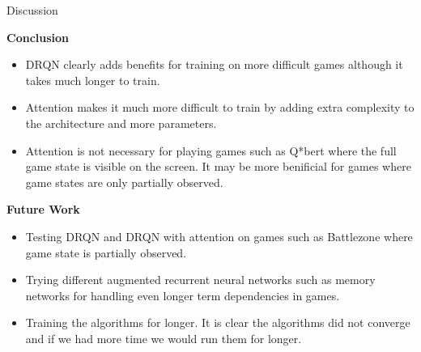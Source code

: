 \documentclass[final]{beamer}
\newlength{\onecolwid}
\begin{document}
\begin{frame}[t]
\begin{columns}[t]
\begin{column}{\onecolwid}
\begin{block}{Discussion}
\begin{center}
\textbf{Conclusion}
\end{center}
\begin{itemize}
    \item DRQN clearly adds benefits for training on more difficult games although
        it takes much longer to train.
    \item Attention makes it much more difficult to train by adding extra complexity
        to the architecture and more parameters.
    \item Attention is not necessary for playing games such as Q*bert where the full
        game state is visible on the screen. It may be more benificial for games
        where game states are only partially observed.
\end{itemize}
\begin{center}
\textbf{Future Work}
\end{center}
\begin{itemize}
    \item Testing DRQN and DRQN with attention on games such as Battlezone
        where game state is partially observed.
    \item Trying different augmented recurrent neural networks such as memory
        networks for handling even longer term dependencies in games.
    \item Training the algorithms for longer. It is clear the algorithms did not
        converge and if we had more time we would run them for longer.
\end{itemize}

\end{block}


\end{column} %

\end{columns} %

\end{frame} %
\end{document}
